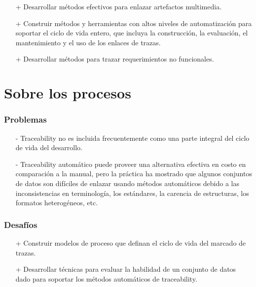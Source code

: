 \documentclass[a4paper,12pt,oneside,spanish]{book}
\begin{document}
\begin{itemize}

\item[+] Desarrollar métodos efectivos para enlazar artefactos multimedia.

\item[+] Construir métodos y herramientas con altos niveles de automatización para soportar el ciclo de vida entero, que incluya la construcción, la evaluación, el mantenimiento y el uso de los enlaces de trazas.

\item[+] Desarrollar métodos para trazar requerimientos no funcionales.

\end{itemize}

\section{Sobre los procesos}

\subsubsection{Problemas}

\begin{itemize}

\item[-] Traceability no es incluida frecuentemente como una parte integral del ciclo de vida del desarrollo.

\item[-] Traceability automático puede proveer una alternativa efectiva en costo en comparación a la manual, pero la práctica ha mostrado que algunos conjuntos de datos son difíciles de enlazar usando métodos automáticos debido a las inconsistencias en terminología, los estándares, la carencia de estructuras, los formatos heterogéneos, etc.

\end{itemize}

\subsubsection{Desafíos}

\begin{itemize}

\item[+] Construir modelos de proceso que definan el ciclo de vida del marcado de trazas.

\item[+] Desarrollar técnicas para evaluar la habilidad de un conjunto de datos dado para soportar los métodos automáticos de traceability.
 
\end{itemize}
\end{document}
